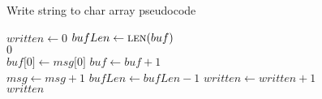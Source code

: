 \documentclass[12pt]{report}
\begin{document}
\begin{algorithm}
    \caption{Write string to char array pseudocode}
    \label{code:write_string}
    \begin{algorithmic}[1]

            \State $written \gets 0$
            \State $bufLen \gets \Call {len}{buf}$\\

                \State \Return $0$
            \EndIf\\

                    \State $buf \lbrack 0 \rbrack \gets msg \lbrack 0
                        \rbrack$
                    \State $buf \gets buf + 1$
                \EndIf\\

                \State $msg \gets msg + 1$
                \State $bufLen \gets bufLen - 1$
                \State $written \gets written + 1$
            \EndWhile\\

            \State \Return $written$
        \EndFunction
    \end{algorithmic}
\end{algorithm}
\end{document}
